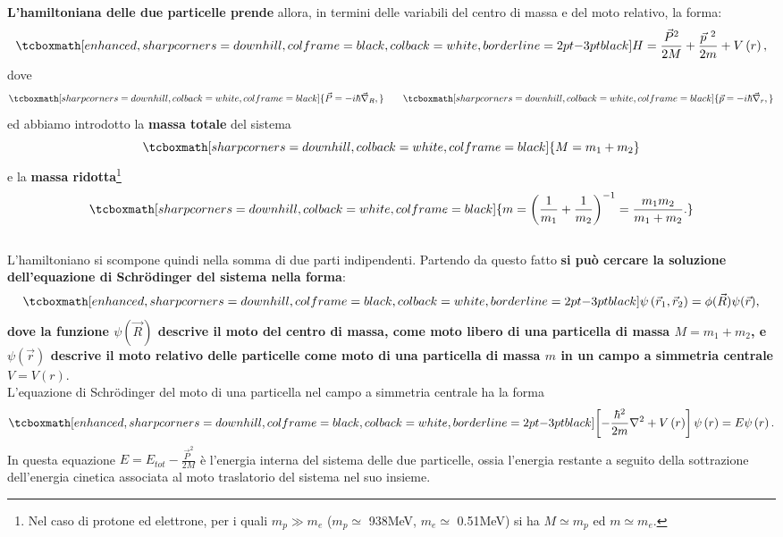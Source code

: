 \textbf{L'hamiltoniana delle due particelle prende} allora, in termini delle variabili del centro di massa e del moto relativo, la forma:
	\begin{equation}
		\tcboxmath[enhanced, sharp corners=downhill, colframe=black, colback=white, borderline={2pt}{-3pt}{black}]{
			H=\frac{\vec{P}^{2}}{2M}+\frac{\vec{p}^{\ 2}}{2m}+V\left(r\right) , 
			}
	\end{equation}
dove
	\begin{equation}
		\tcboxmath[sharp corners=downhill, colback=white, colframe=black]{
			\vec{P}=-i\hbar\vec{\nabla}_R,
			} \qquad
		\tcboxmath[sharp corners=downhill, colback=white, colframe=black]{
			\vec{p}=-i\hbar\vec{\nabla}_r ,
			}
\end{equation}
ed abbiamo introdotto la \textbf{massa totale} del sistema
	\begin{equation}
		\tcboxmath[sharp corners=downhill, colback=white, colframe=black]{
			M=m_1+m_2
			}
	\end{equation}
e la \textbf{massa ridotta}\footnote{Nel caso di protone ed elettrone, per i quali $m_p \gg m_e$ ($m_p \simeq$ 938MeV, $m_e\simeq$ 0.51MeV) si ha $M\simeq m_p$ ed $m\simeq m_e$.}
	\begin{equation}
		\tcboxmath[sharp corners=downhill, colback=white, colframe=black]{
			m=\left(\frac{1}{m_1}+\frac{1}{m_2}\right)^{-1}=\frac{m_1m_2}{m_1+m_2}.
			}
	\end{equation}\\
	
L'hamiltoniano si scompone quindi nella somma di due parti indipendenti. Partendo da questo fatto \textbf{si può cercare la soluzione dell'equazione di Schr\"{o}dinger del sistema nella forma}:
	\begin{equation}
		\tcboxmath[enhanced, sharp corners=downhill, colframe=black, colback=white, borderline={2pt}{-3pt}{black}]{
			\psi\left(\vec{r}_1,\vec{r}_2\right)=\phi(\vec{R})\psi(\vec{r}) ,
			}
	\end{equation}
\textbf{dove la funzione $\psi (\vec{R} )$ descrive il moto del centro di massa, come moto libero di una particella di massa $M=m_1+m_2$, e $\psi\left(\vec{r}\right)$ descrive il moto relativo delle particelle come moto di una particella di massa $m$ in un campo a simmetria centrale $V=V\left(r\right)$}.\\

L'equazione di Schr\"{o}dinger del moto di una particella nel campo a simmetria centrale ha la forma
	\begin{equation}
		\tcboxmath[enhanced, sharp corners=downhill, colframe=black, colback=white, borderline={2pt}{-3pt}{black}]{
			\left[-\frac{\hbar^2}{2m}\nabla^2+V\left( r \right) \right]\psi\left(r\right)=E\psi\left(r\right).
			}
	\label{21.1}
	\end{equation} 
In questa equazione \textbf{$E=E_{tot}-\frac{\vec{P}^2}{2M}$} è l'energia interna del sistema delle due particelle, ossia l'energia restante a seguito della sottrazione dell'energia cinetica associata al moto traslatorio del sistema nel suo insieme.\\ 

